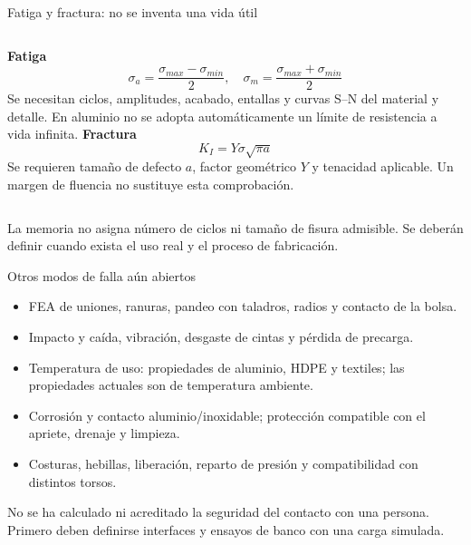 \documentclass[10pt,aspectratio=169]{beamer}
\newcommand{\mcref}{Guía de diseño}
\begin{document}
\gdef\mcref{Mathcad: sección 26 / pág. 44}
\begin{frame}[t]{Fatiga y fractura: no se inventa una vida útil}

\begin{columns}[T,onlytextwidth]
\textbf{Fatiga}
\[
\sigma_a=\frac{\sigma_{max}-\sigma_{min}}2,\quad
\sigma_m=\frac{\sigma_{max}+\sigma_{min}}2
\]
Se necesitan ciclos, amplitudes, acabado, entallas y curvas S--N del material y detalle. En aluminio no se adopta automáticamente un límite de resistencia a vida infinita.
\textbf{Fractura}
\[
K_I=Y\sigma\sqrt{\pi a}
\]
Se requieren tamaño de defecto $a$, factor geométrico $Y$ y tenacidad aplicable. Un margen de fluencia no sustituye esta comprobación.
\end{columns}
\medskip
La memoria no asigna número de ciclos ni tamaño de fisura admisible. Se deberán definir cuando exista el uso real y el proceso de fabricación.

\end{frame}

\gdef\mcref{Mathcad: sección 26 / pág. 44}
\begin{frame}[t]{Otros modos de falla aún abiertos}

\begin{itemize}
\item FEA de uniones, ranuras, pandeo con taladros, radios y contacto de la bolsa.
\item Impacto y caída, vibración, desgaste de cintas y pérdida de precarga.
\item Temperatura de uso: propiedades de aluminio, HDPE y textiles; las propiedades actuales son de temperatura ambiente.
\item Corrosión y contacto aluminio/inoxidable; protección compatible con el apriete, drenaje y limpieza.
\item Costuras, hebillas, liberación, reparto de presión y compatibilidad con distintos torsos.
\end{itemize}
No se ha calculado ni acreditado la seguridad del contacto con una persona. Primero deben definirse interfaces y ensayos de banco con una carga simulada.

\end{frame}
\end{document}
